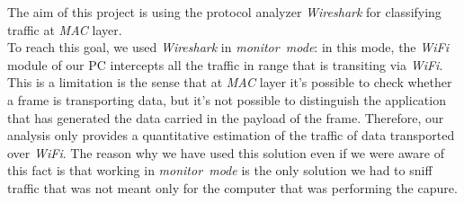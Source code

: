 The aim of this project is using the protocol analyzer \textit{Wireshark} for classifying traffic at \textit{MAC} layer.\\ 
To reach this goal, we used \textit{Wireshark} in \textit{monitor\ mode}: in this mode, the \textit{WiFi} module of our PC
intercepts all the traffic in range that is transiting via \textit{WiFi}.\\ 
This is a limitation is the sense that at \textit{MAC} layer it's possible to check whether a frame is transporting data, but it's not 
possible to distinguish the application that has generated the data carried in the payload of the frame. Therefore, our 
analysis only provides a quantitative estimation of the traffic of data transported over \textit{WiFi}. The reason why we have 
used this solution even if we were aware of this fact is that working in \textit{monitor\ mode} is the only solution we had
to sniff traffic that was not meant only for the computer that was performing the capure.\\

